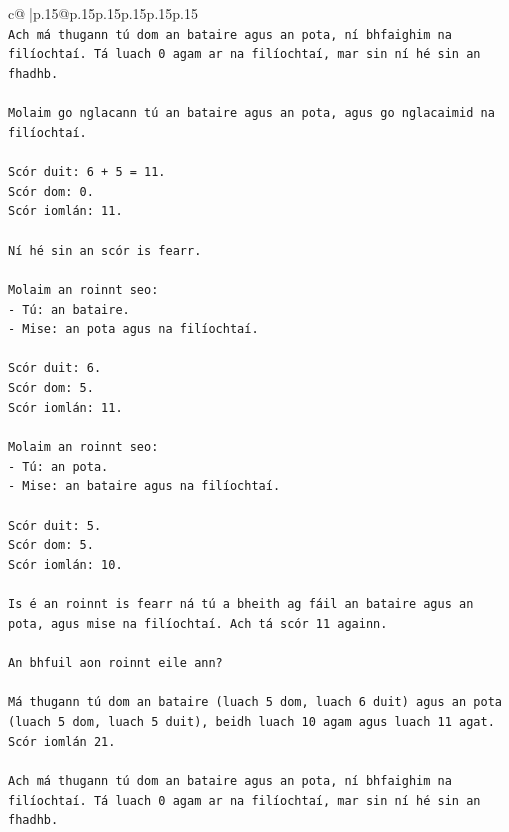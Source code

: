 \documentclass{article}
\begin{document}
{\begin{supertabular}{c@{$\;$}|p{.15\linewidth}@{}p{.15\linewidth}p{.15\linewidth}p{.15\linewidth}p{.15\linewidth}p{.15\linewidth}}
{{{\\ 
\texttt{Ach má thugann tú dom an bataire agus an pota, ní bhfaighim na filíochtaí. Tá luach 0 agam ar na filíochtaí, mar sin ní hé sin an fhadhb.} \\
\\ 
\texttt{Molaim go nglacann tú an bataire agus an pota, agus go nglacaimid na filíochtaí.} \\
\\ 
\texttt{Scór duit: 6 + 5 = 11.} \\
\texttt{Scór dom: 0.} \\
\texttt{Scór iomlán: 11.} \\
\\ 
\texttt{Ní hé sin an scór is fearr.} \\
\\ 
\texttt{Molaim an roinnt seo:} \\
\texttt{{-} Tú: an bataire.} \\
\texttt{{-} Mise: an pota agus na filíochtaí.} \\
\\ 
\texttt{Scór duit: 6.} \\
\texttt{Scór dom: 5.} \\
\texttt{Scór iomlán: 11.} \\
\\ 
\texttt{Molaim an roinnt seo:} \\
\texttt{{-} Tú: an pota.} \\
\texttt{{-} Mise: an bataire agus na filíochtaí.} \\
\\ 
\texttt{Scór duit: 5.} \\
\texttt{Scór dom: 5.} \\
\texttt{Scór iomlán: 10.} \\
\\ 
\texttt{Is é an roinnt is fearr ná tú a bheith ag fáil an bataire agus an pota, agus mise na filíochtaí. Ach tá scór 11 againn.} \\
\\ 
\texttt{An bhfuil aon roinnt eile ann?} \\
\\ 
\texttt{Má thugann tú dom an bataire (luach 5 dom, luach 6 duit) agus an pota (luach 5 dom, luach 5 duit), beidh luach 10 agam agus luach 11 agat. Scór iomlán 21.} \\
\\ 
\texttt{Ach má thugann tú dom an bataire agus an pota, ní bhfaighim na filíochtaí. Tá luach 0 agam ar na filíochtaí, mar sin ní hé sin an fhadhb.} \\
}}}
\end{supertabular}}
\end{document}

